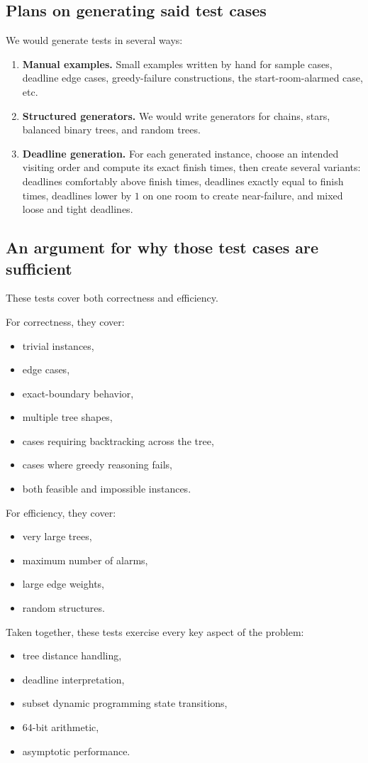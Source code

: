 \documentclass[11pt]{article}
\begin{document}
\subsection*{Plans on generating said test cases}
We would generate tests in several ways:

\begin{enumerate}
    \item \textbf{Manual examples.} Small examples written by hand for sample cases, deadline edge cases, greedy-failure constructions, the start-room-alarmed case, etc.
    
    \item \textbf{Structured generators.} We would write generators for chains, stars, balanced binary trees, and random trees.
    
    \item \textbf{Deadline generation.} For each generated instance, choose an intended visiting order and compute its exact finish times, then create several variants: deadlines comfortably above finish times, deadlines exactly equal to finish times, deadlines lower by $1$ on one room to create near-failure, and mixed loose and tight deadlines.
\end{enumerate}

\subsection*{An argument for why those test cases are sufficient}
These tests cover both correctness and efficiency.

For correctness, they cover:
\begin{itemize}
    \item trivial instances,
    \item edge cases,
    \item exact-boundary behavior,
    \item multiple tree shapes,
    \item cases requiring backtracking across the tree,
    \item cases where greedy reasoning fails,
    \item both feasible and impossible instances.
\end{itemize}

For efficiency, they cover:
\begin{itemize}
    \item very large trees,
    \item maximum number of alarms,
    \item large edge weights,
    \item random structures.
\end{itemize}

Taken together, these tests exercise every key aspect of the problem:
\begin{itemize}
    \item tree distance handling,
    \item deadline interpretation,
    \item subset dynamic programming state transitions,
    \item 64-bit arithmetic,
    \item asymptotic performance.
\end{itemize}
\end{document}
